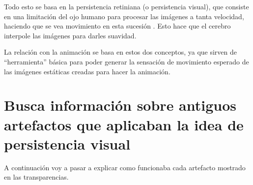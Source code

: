 \documentclass{article}
\begin{document}
\bigskip

Todo esto se basa en la persistencia retiniana (o persistencia visual), que consiste en una limitación del ojo humano para procesar las imágenes a tanta velocidad, haciendo que se vea movimiento en esta sucesión \cite{wikipers}. Esto hace que el cerebro interpole las imágenes para darles suavidad.

\bigskip

La relación con la animación se basa en estos dos conceptos, ya que sirven de ``herramienta'' básica para poder generar la sensación de movimiento esperado de las imágenes estáticas creadas para hacer la animación. 


\section{Busca información sobre antiguos artefactos que aplicaban la idea de persistencia visual}

A continuación voy a pasar a explicar como funcionaba cada artefacto mostrado en las transparencias.
\end{document}

